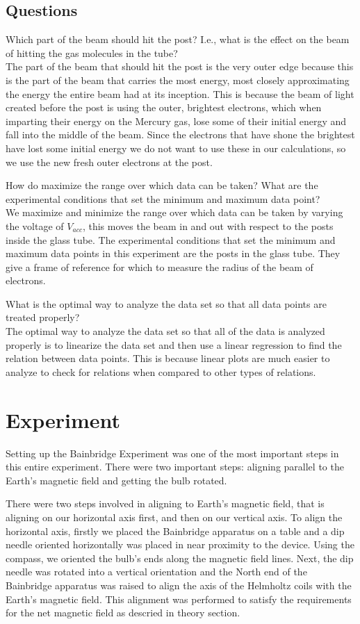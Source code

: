\documentclass[aps,prl,10pt,twocolumn,floatfix]{revtex4-2}
\begin{document}
\subsection{Questions}
Which part of the beam should hit the post? I.e., what is the effect on the beam of hitting the gas
molecules in the tube?\\
The part of the beam that should hit the post is the very outer edge because this is the part of the beam that carries the most energy, most closely approximating the energy the entire beam had at its inception.
This is because the beam of light created before the post is using the outer, brightest electrons, which when imparting their energy on the Mercury gas, lose some of their initial energy and fall into the middle of the beam.
Since the electrons that have shone the brightest have lost some initial energy we do not want to use these in our calculations, so we use the new fresh outer electrons at the post.

How do maximize the range over which data can be taken? What are the experimental conditions that
set the minimum and maximum data point?\\
We maximize and minimize the range over which data can be taken by varying the voltage of $V_{acc}$, this moves the beam in and out with respect to the posts inside the glass tube.
The experimental conditions that set the minimum and maximum data points in this experiment are the posts in the glass tube.
They give a frame of reference for which to measure the radius of the beam of electrons.

What is the optimal way to analyze the data set so that all data points are treated properly?\\
The optimal way to analyze the data set so that all of the data is analyzed properly is to linearize the data set and then use a linear regression to find the relation between data points.
This is because linear plots are much easier to analyze to check for relations when compared to other types of relations.

\section{Experiment}
Setting up the Bainbridge Experiment was one of the most important steps in this entire experiment.
There were two important steps: aligning parallel to the Earth's magnetic field and getting the bulb rotated.

There were two steps involved in aligning to Earth's magnetic field, that is aligning on our horizontal axis first, and then on our vertical axis.
To align the horizontal axis, firstly we placed the Bainbridge apparatus on a table and a dip needle oriented horizontally was placed in near proximity to the device.
Using the compass, we oriented the bulb's ends along the magnetic field lines.
Next, the dip needle was rotated into a vertical orientation and the North end of the Bainbridge apparatus was raised to align the axis of the Helmholtz coils with the Earth's magnetic field.
This alignment was performed to satisfy the requirements for the net magnetic field as descried in theory section.
\end{document}

